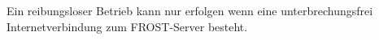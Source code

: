 Ein reibungsloser Betrieb kann nur erfolgen wenn eine unterbrechungsfrei Internetverbindung zum \gls{FROST-Server} besteht.









































































































































%
